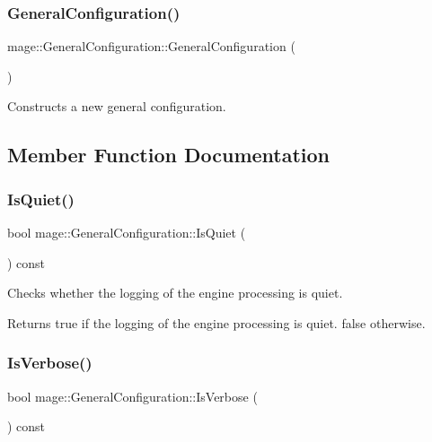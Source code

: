 \subsubsection{\texorpdfstring{General\+Configuration()}{GeneralConfiguration()}}
{\footnotesize\ttfamily mage\+::\+General\+Configuration\+::\+General\+Configuration (\begin{DoxyParamCaption}{ }\end{DoxyParamCaption})}

Constructs a new general configuration. 

\subsection{Member Function Documentation}
\hypertarget{structmage_1_1_general_configuration_a51e37e3d7473c16fa90efa7501f54ebc}{}\label{structmage_1_1_general_configuration_a51e37e3d7473c16fa90efa7501f54ebc} 
\subsubsection{\texorpdfstring{Is\+Quiet()}{IsQuiet()}}
{\footnotesize\ttfamily bool mage\+::\+General\+Configuration\+::\+Is\+Quiet (\begin{DoxyParamCaption}{ }\end{DoxyParamCaption}) const}

Checks whether the logging of the engine processing is quiet.

\begin{DoxyReturn}{Returns}
{\ttfamily true} if the logging of the engine processing is quiet. {\ttfamily false} otherwise. 
\end{DoxyReturn}
\hypertarget{structmage_1_1_general_configuration_affb1e42d744f4f75d244dc63278a4e94}{}\label{structmage_1_1_general_configuration_affb1e42d744f4f75d244dc63278a4e94} 
\subsubsection{\texorpdfstring{Is\+Verbose()}{IsVerbose()}}
{\footnotesize\ttfamily bool mage\+::\+General\+Configuration\+::\+Is\+Verbose (\begin{DoxyParamCaption}{ }\end{DoxyParamCaption}) const}


